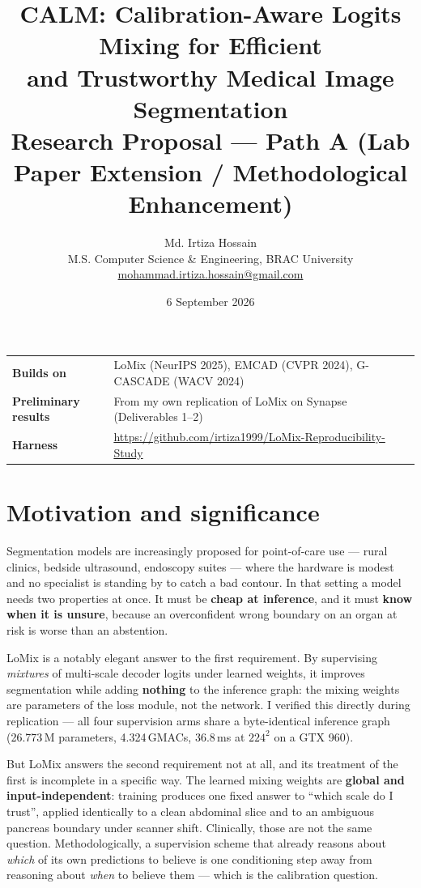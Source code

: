 \documentclass[11pt,a4paper]{article}
\title{\vspace{-2em}\textbf{CALM: Calibration-Aware Logits Mixing for Efficient}\\
\textbf{and Trustworthy Medical Image Segmentation}\\[0.4em]
\large Research Proposal --- Path A (Lab Paper Extension / Methodological Enhancement)}
\author{Md. Irtiza Hossain \\
\small M.S. Computer Science \& Engineering, BRAC University \\
\small \href{mailto:mohammad.irtiza.hossain@gmail.com}{mohammad.irtiza.hossain@gmail.com}}
\date{6 September 2026}
\begin{document}
\maketitle

\noindent\begin{tabular}{@{}ll@{}}
\textbf{Builds on} & LoMix (NeurIPS 2025), EMCAD (CVPR 2024), G-CASCADE (WACV 2024) \\
\textbf{Preliminary results} & From my own replication of LoMix on Synapse (Deliverables 1--2) \\
\textbf{Harness} & \url{https://github.com/irtiza1999/LoMix-Reproducibility-Study} \\
\end{tabular}

\section{Motivation and significance}

Segmentation models are increasingly proposed for point-of-care use --- rural
clinics, bedside ultrasound, endoscopy suites --- where the hardware is modest
and no specialist is standing by to catch a bad contour. In that setting a model
needs two properties at once. It must be \textbf{cheap at inference}, and it
must \textbf{know when it is unsure}, because an overconfident wrong boundary on
an organ at risk is worse than an abstention.

LoMix is a notably elegant answer to the first requirement. By supervising
\emph{mixtures} of multi-scale decoder logits under learned weights, it improves
segmentation while adding \textbf{nothing} to the inference graph: the mixing
weights are parameters of the loss module, not the network. I verified this
directly during replication --- all four supervision arms share a byte-identical
inference graph (26.773\,M parameters, 4.324\,GMACs, 36.8\,ms at $224^2$ on a
GTX 960).

But LoMix answers the second requirement not at all, and its treatment of the
first is incomplete in a specific way. The learned mixing weights are
\textbf{global and input-independent}: training produces one fixed answer to
``which scale do I trust'', applied identically to a clean abdominal slice and
to an ambiguous pancreas boundary under scanner shift. Clinically, those are not
the same question. Methodologically, a supervision scheme that already reasons
about \emph{which} of its own predictions to believe is one conditioning step
away from reasoning about \emph{when} to believe them --- which is the
calibration question.
\end{document}
